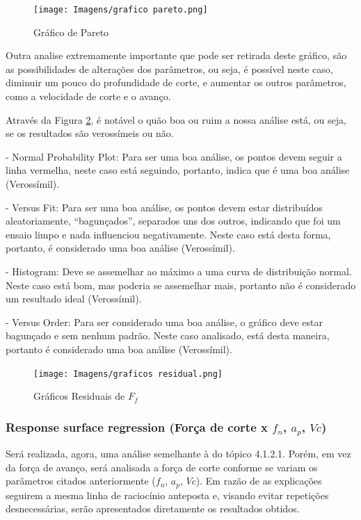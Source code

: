 \documentclass[deposito, acronym, symbols]{fei}
\begin{document}
\begin{figure}[!htp]
    \centering
    \caption{Gráfico de Pareto}
    \texttt{[image: Imagens/grafico pareto.png]}
    \label{fig:gp1}
\end{figure}

Outra analise extremamente importante que pode ser retirada deste gráfico, são as possibilidades de alterações dos parâmetros, ou seja, é possível neste caso, diminuir um pouco do profundidade de corte, e aumentar os outros parâmetros, como a velocidade de corte e o avanço. 

Através da Figura \ref{fig:gr1}, é notável o quão boa ou ruim a nossa análise está, ou seja, se os resultados são verossímeis ou não. 

- Normal Probability Plot: Para ser uma boa análise, os pontos devem seguir a linha vermelha, neste caso está seguindo, portanto, indica que é uma boa análise (Verossímil).

- Versus Fit: Para ser uma boa análise, os pontos devem estar distribuídos aleatoriamente, “bagunçados”, separados uns dos outros, indicando que foi um ensaio limpo e nada influenciou negativamente. Neste caso está desta forma, portanto, é considerado uma boa análise (Verossímil).

- Histogram: Deve se assemelhar ao máximo a uma curva de distribuição normal. Neste caso está bom, mas poderia se assemelhar mais, portanto não é considerado um resultado ideal (Verossímil).

- Versus Order: Para ser considerado uma boa análise, o gráfico deve estar bagunçado e sem nenhum padrão. Neste caso analisado, está desta maneira, portanto é considerado uma boa análise (Verossímil).

\begin{figure}[!htp]
    \centering
    \caption{Gráficos Residuais de $F_f$}
    \texttt{[image: Imagens/graficos residual.png]}
    \label{fig:gr1}
\end{figure}

\subsubsection{Response surface regression (Força de corte x $f_n$, $a_p$, $Vc$)}

Será realizada, agora, uma análise semelhante à do tópico 4.1.2.1. Porém, em vez da força de avanço, será analisada a força de corte conforme se variam os parâmetros citados anteriormente ($f_n$, $a_p$, $Vc$). Em razão de as explicações seguirem a mesma linha de raciocínio anteposta e, visando evitar repetições desnecessárias, serão apresentados diretamente os resultados obtidos.
\end{document}
